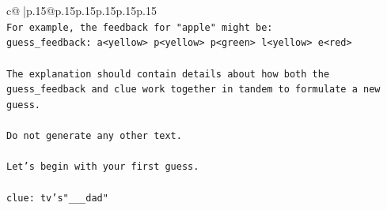 \documentclass{article}
\begin{document}
{\begin{supertabular}{c@{$\;$}|p{.15\linewidth}@{}p{.15\linewidth}p{.15\linewidth}p{.15\linewidth}p{.15\linewidth}p{.15\linewidth}}
{{{\\ 
\texttt{For example, the feedback for "apple" might be:} \\
\texttt{guess\_feedback: a<yellow> p<yellow> p<green> l<yellow> e<red>} \\
\\ 
\texttt{The explanation should contain details about how both the guess\_feedback and clue work together in tandem to formulate a new guess.} \\
\\ 
\texttt{Do not generate any other text.} \\
\\ 
\texttt{Let's begin with your first guess.} \\
\\ 
\texttt{clue: tv's"\_\_\_dad"} \\
            }
        }
    }
     \\ \\


\end{supertabular}}
\end{document}
